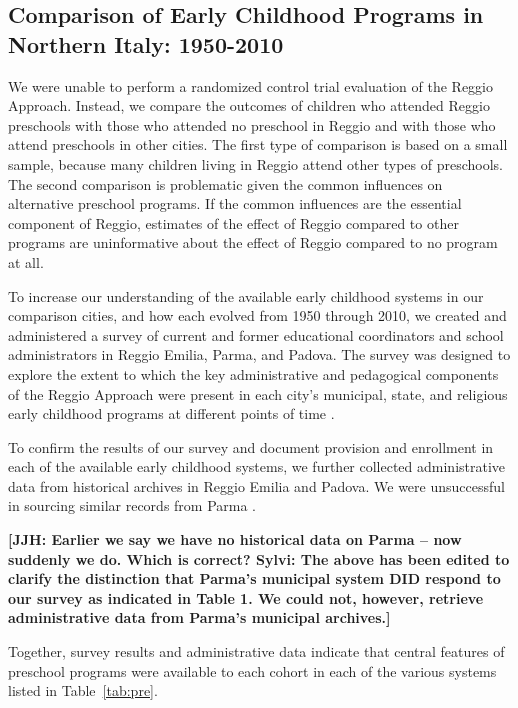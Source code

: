 \subsection{Comparison of Early Childhood Programs in Northern Italy: 1950-2010}

We were unable to perform a randomized control trial evaluation of the Reggio Approach. Instead, we compare the outcomes of children who attended Reggio preschools with those who attended no preschool in Reggio and with those who attend preschools in other cities. The first type of comparison is based on a small sample, because many children living in Reggio attend other types of preschools. The second comparison is problematic given the common influences on alternative preschool programs. If the common influences are the essential component of Reggio, estimates of the effect of Reggio compared to other programs are uninformative about the effect of Reggio compared to no program at all.

To increase our understanding of the available early childhood systems in our comparison cities, and how each evolved from 1950 through 2010, we created and administered a survey of current and former educational coordinators and school administrators in Reggio Emilia, Parma, and Padova. The survey was designed to explore the extent to which the key administrative and pedagogical components of the Reggio Approach were present in each city's municipal, state, and religious early childhood programs at different points of time \citep{CEHD_2016_Historical-Analysis}. 

To confirm the results of our survey and document provision and enrollment in each of the available early childhood systems, we further collected administrative data from historical archives in Reggio Emilia and Padova. We were unsuccessful in sourcing similar records from Parma \citep{Padova-Admin-Data_1964-2011,Reggio-Admin-data_1966-2006,Reggio-Annual-Journals_1994-2011}. 

\textbf{[JJH: Earlier we say we have no historical data on Parma -- now suddenly we do. Which is correct? Sylvi: The above has been edited to clarify the distinction that Parma's municipal system DID respond to our survey as indicated in Table 1. We could not, however, retrieve administrative data from Parma's municipal archives.]}

Together, survey results and administrative data indicate that central features of preschool programs were available to each cohort in each of the various systems listed in Table~\ref{tab:pre}. 

